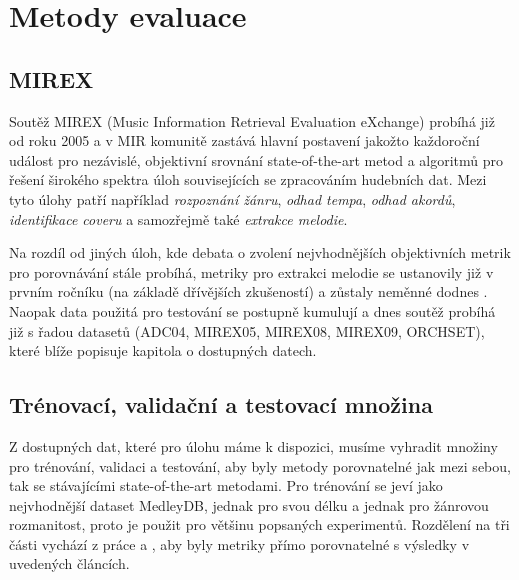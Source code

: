\chapter{Metody evaluace}

\section{MIREX}

Soutěž MIREX (Music Information Retrieval Evaluation eXchange) probíhá již od roku 2005 a v MIR komunitě zastává hlavní postavení jakožto každoroční událost pro nezávislé, objektivní srovnání state-of-the-art metod a algoritmů pro řešení širokého spektra úloh souvisejících se zpracováním hudebních dat. Mezi tyto úlohy patří například \textit{rozpoznání žánru}, \textit{odhad tempa}, \textit{odhad akordů}, \textit{identifikace coveru} a samozřejmě také \textit{extrakce melodie}.

Na rozdíl od jiných úloh, kde debata o zvolení nejvhodnějších objektivních metrik pro porovnávání stále probíhá, metriky pro extrakci melodie se ustanovily již v prvním ročníku (na základě dřívějších zkušeností) a zůstaly neměnné dodnes \cite{Raffel2014}. Naopak data použitá pro testování se postupně kumulují a dnes soutěž probíhá již s řadou datasetů (ADC04, MIREX05, MIREX08, MIREX09, ORCHSET), které blíže popisuje kapitola o dostupných datech.


\section{Trénovací, validační a testovací množina}

Z dostupných dat, které pro úlohu máme k dispozici, musíme vyhradit množiny pro trénování, validaci a testování, aby byly metody porovnatelné jak mezi sebou, tak se stávajícími state-of-the-art metodami. Pro trénování se jeví jako nejvhodnější dataset MedleyDB, jednak pro svou délku a jednak pro žánrovou rozmanitost, proto je použit pro většinu popsaných experimentů. Rozdělení na tři části vychází z práce \cite{Bittner2017} a \cite{DBasaranSEssid2018}, aby byly metriky přímo porovnatelné s výsledky v uvedených článcích. 


